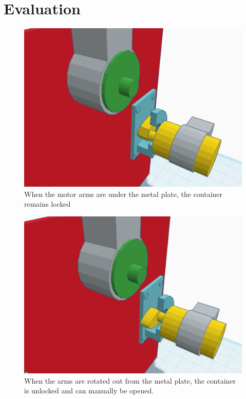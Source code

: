 \documentclass[conference]{IEEEtran}
\begin{document}
\section{Evaluation}


\begin{figure}[H]
    \centering
    \includegraphics[width=0.85\columnwidth]{Images/ClosedLock.png}
    \caption{When the motor arms are under the metal plate, the container remains locked}
\end{figure}

\begin{figure}[H]
    \centering
    \includegraphics[width=0.85\columnwidth]{Images/OpenLock.png}
    \caption{When the arms are rotated out from the metal plate, the container is unlocked and can manually be opened.}
\end{figure}
\end{document}
